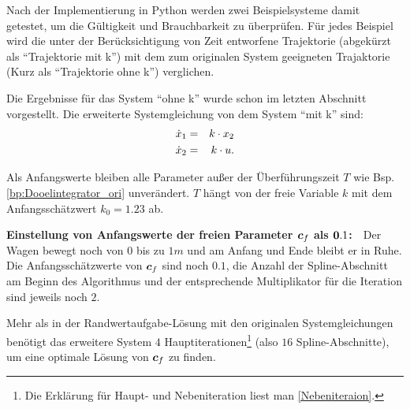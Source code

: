 Nach der Implementierung in Python werden zwei Beispielsysteme damit getestet, um die Gültigkeit und Brauchbarkeit zu überprüfen. Für jedes Beispiel wird die unter der Berücksichtigung von Zeit entworfene Trajektorie (abgekürzt als ``Trajektorie mit k'') mit dem zum originalen System geeigneten Trajaktorie (Kurz als ``Trajektorie ohne k'') verglichen.
\begin{beispiel}[Doppelintegrator]\label{bp:Doppelintegrator_k}
	Die Ergebnisse für das System ``ohne k'' wurde schon im letzten Abschnitt vorgestellt. Die erweiterte Systemgleichung von dem System ``mit k'' sind:
	\begin{eqnarray}
	\dot{x}_{1} &=& k \cdot x_{2}\notag\\
	\dot{x}_{2} &=& k \cdot u.
	\label{eq:Doppelintegrator_mit_k}
	\end{eqnarray}
	
	Als Anfangswerte bleiben alle Parameter außer der Überführungszeit $T$ wie Bsp. \ref{bp:Dooelintegrator_ori} unverändert. $T$ hängt von der freie Variable $k$ mit dem Anfangsschätzwert $k_{0}=1.23$ ab.
	
	\textbf{Einstellung von Anfangswerte der freien Parameter $\boldsymbol c_{f}$ als $\boldsymbol 0.1$:}~~Der Wagen bewegt noch von $0$ bis zu $1m$ und am Anfang und Ende bleibt er in Ruhe. Die Anfangsschätzwerte von $\boldsymbol c_{f}$ sind noch $0.1$, die Anzahl der Spline-Abschnitt am Beginn des Algorithmus und der entsprechende Multiplikator für die Iteration sind jeweils noch $2$. 
	
	Mehr als in der Randwertaufgabe-Lösung mit den originalen Systemgleichungen benötigt das erweitere System $4$ Hauptiterationen\footnote{Die Erklärung für Haupt- und Nebeniteration liest man \ref{Nebeniteraion}.} (also $16$ Spline-Abschnitte), um eine optimale Lösung von $\boldsymbol c_{f}$ zu finden.
	

\end{beispiel}
